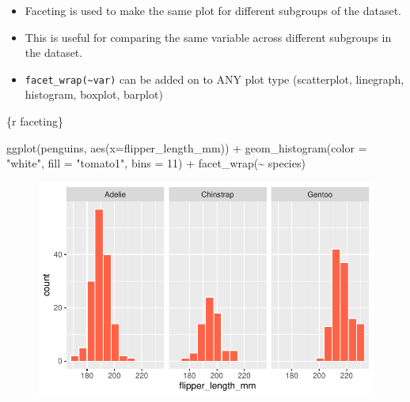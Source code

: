 \documentclass[
  letterpaper,
  DIV=11,
  numbers=noendperiod]{scrreprt}
\newenvironment{Shaded}{\begin{snugshade}}{\end{snugshade}}
\newcommand{\AttributeTok}[1]{\textcolor[rgb]{0.40,0.45,0.13}{#1}}
\newcommand{\DecValTok}[1]{\textcolor[rgb]{0.68,0.00,0.00}{#1}}
\newcommand{\FunctionTok}[1]{\textcolor[rgb]{0.28,0.35,0.67}{#1}}
\newcommand{\InformationTok}[1]{\textcolor[rgb]{0.37,0.37,0.37}{#1}}
\newcommand{\NormalTok}[1]{\textcolor[rgb]{0.00,0.23,0.31}{#1}}
\newcommand{\SpecialCharTok}[1]{\textcolor[rgb]{0.37,0.37,0.37}{#1}}
\newcommand{\StringTok}[1]{\textcolor[rgb]{0.13,0.47,0.30}{#1}}
\begin{document}
\begin{tcolorbox}[enhanced jigsaw, colframe=quarto-callout-note-color-frame, breakable, colback=white, toprule=.15mm, leftrule=.75mm, left=2mm, opacityback=0, rightrule=.15mm, arc=.35mm, bottomrule=.15mm]

\begin{itemize}
\item
  Faceting is used to make the same plot for different subgroups of the
  dataset.
\item
  This is useful for comparing the same variable across different
  subgroups in the dataset.
\item
  \texttt{facet\_wrap(\textasciitilde{}var)} can be added on to ANY plot
  type (scatterplot, linegraph, histogram, boxplot, barplot)
\end{itemize}

\begin{Shaded}
\begin{Highlighting}[]
\InformationTok{\textasciigrave{}\textasciigrave{}\textasciigrave{}\{r faceting\}}

\FunctionTok{ggplot}\NormalTok{(penguins, }\FunctionTok{aes}\NormalTok{(}\AttributeTok{x=}\NormalTok{flipper\_length\_mm)) }\SpecialCharTok{+}
    \FunctionTok{geom\_histogram}\NormalTok{(}\AttributeTok{color =} \StringTok{"white"}\NormalTok{, }\AttributeTok{fill =} \StringTok{"tomato1"}\NormalTok{, }\AttributeTok{bins =} \DecValTok{11}\NormalTok{) }\SpecialCharTok{+}
    \FunctionTok{facet\_wrap}\NormalTok{(}\SpecialCharTok{\textasciitilde{}}\NormalTok{ species)}
\InformationTok{\textasciigrave{}\textasciigrave{}\textasciigrave{}}
\end{Highlighting}
\end{Shaded}

\begin{figure}[H]

{\centering \includegraphics{04-content_files/figure-pdf/faceting-1.pdf}

}

\end{figure}

\end{tcolorbox}
\end{document}
